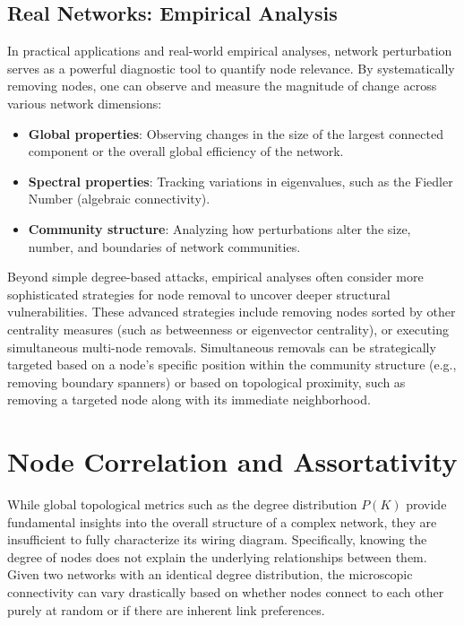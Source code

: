 \subsection{Real Networks: Empirical Analysis}
\label{subsec:empirical_analysis}

In practical applications and real-world empirical analyses, network perturbation serves as a powerful diagnostic tool to quantify node relevance. By systematically removing nodes, one can observe and measure the magnitude of change across various network dimensions:
\begin{itemize}
    \item \textbf{Global properties}: Observing changes in the size of the largest connected component or the overall global efficiency of the network.
    \item \textbf{Spectral properties}: Tracking variations in eigenvalues, such as the Fiedler Number (algebraic connectivity).
    \item \textbf{Community structure}: Analyzing how perturbations alter the size, number, and boundaries of network communities.
\end{itemize}

Beyond simple degree-based attacks, empirical analyses often consider more sophisticated strategies for node removal to uncover deeper structural vulnerabilities. These advanced strategies include removing nodes sorted by other centrality measures (such as betweenness or eigenvector centrality), or executing simultaneous multi-node removals. Simultaneous removals can be strategically targeted based on a node's specific position within the community structure (e.g., removing boundary spanners) or based on topological proximity, such as removing a targeted node along with its immediate neighborhood.

\section{Node Correlation and Assortativity}
\label{sec:node_correlation_assortativity}

While global topological metrics such as the degree distribution $P(K)$ provide fundamental insights into the overall structure of a complex network, they are insufficient to fully characterize its wiring diagram. Specifically, knowing the degree of nodes does not explain the underlying relationships between them. Given two networks with an identical degree distribution, the microscopic connectivity can vary drastically based on whether nodes connect to each other purely at random or if there are inherent link preferences.


